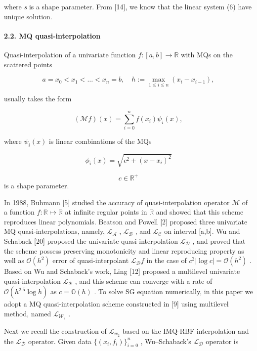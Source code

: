 \documentclass[12pt]{article}
\begin{document}
where \emph{s} is a shape parameter. From {[}14{]}, we know that the linear system (6) have unique solution.

\hypertarget{mq-quasi-interpolation}{%
\paragraph{2.2. MQ quasi-interpolation}\label{mq-quasi-interpolation}}

Quasi-interpolation of a univariate function \(f:[a,b]\to\mathbb{R}\)
with MQs on the scattered points

\[a = x_0 < x_1 < \dots < x_n = b, \quad h := \max_{1 \le i \le n} (x_i - x_{i-1}),\tag{8}\]

usually takes the form

\[(\mathcal{M}f)(x) = \sum_{i=0}^{n} f(x_i)\psi_i(x), \tag{9}\]

where \(\psi_i(x)\) is linear combinations of the MQs

\[\phi_i(x) = \sqrt{c^2 + (x - x_i)^2}  \tag{10}\] 

 \[ c \in \mathbb{R}^+ \]is a shape parameter.

In 1988, Buhmann {[}5{]} studied the accuracy of quasi-interpolation operator \(\mathcal{M}\) of a function
\(f: \mathbb{R} \mapsto \mathbb{R}\) at infinite regular points in \(\mathbb{R}\) and showed that this scheme reproduces linear
polynomials. Beatson and Powell {[}2{]} proposed three univariate MQ quasi-interpolations, namely, \(\mathcal{L}_{\mathcal{A}}\) , \(\mathcal{L}_{\mathcal{B}}\) , and \(\mathcal{L}_{\mathcal{C}}\) on interval {[}a,b{]}. Wu and Schaback {[}20{]} proposed the univariate quasi-interpolation \(\mathcal{L}_{\mathcal{D}}\) , and proved that the scheme possess preserving monotonicity and linear reproducing property as well as \(\mathcal{O}(h^2)\) error of quasi-interpolant
\(\mathcal{L}_{\mathcal{D}}f\) in the case of
\(c^2|\log c|=\mathcal{O}(h^2)\) . Based on Wu and Schaback's work, Ling {[}12{]} proposed a multilevel univariate quasi-interpolation \(\mathcal{L}_{\mathcal{R}}\) , and this scheme can converge with a rate of \(\mathcal{O}(h^{2.5}\log h)\) as \(c=\mathbb{O}(h)\) . To solve SG equation numerically, in this paper we adopt a MQ quasi-interpolation scheme constructed in {[}9{]} using multilevel method, named \(\mathcal{L}_{\mathcal{W}_2}\) .

Next we recall the construction of \(\mathcal{L}_{w_2}\) based on the IMQ-RBF interpolation and the \(\mathcal{L}_{\mathcal{D}}\) operator.
Given data \(\{(x_i, f_i)\}_{i=0}^n\) , Wu--Schaback's
\(\mathcal{L}_{\mathcal{D}}\) operator is
\end{document}
